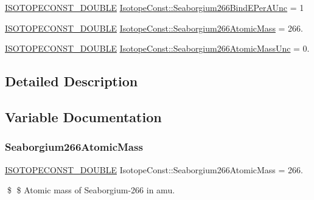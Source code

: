 \begin{DoxyCompactItemize}
\mbox{\hyperlink{group___isotope_const-_macros_ga8f45a7272ce02c0b4c65c44636ed719a}{I\+S\+O\+T\+O\+P\+E\+C\+O\+N\+S\+T\+\_\+\+D\+O\+U\+B\+LE}} \mbox{\hyperlink{group___isotope_const-_seaborgium-_sg266_gafc9faa5a3b4df938ec2469764fbb70aa}{Isotope\+Const\+::\+Seaborgium266\+Bind\+E\+Per\+A\+Unc}} = 1
\item 
\mbox{\hyperlink{group___isotope_const-_macros_ga8f45a7272ce02c0b4c65c44636ed719a}{I\+S\+O\+T\+O\+P\+E\+C\+O\+N\+S\+T\+\_\+\+D\+O\+U\+B\+LE}} \mbox{\hyperlink{group___isotope_const-_seaborgium-_sg266_ga86e309e327c7e48a496f87bc6c057925}{Isotope\+Const\+::\+Seaborgium266\+Atomic\+Mass}} = 266.
\item 
\mbox{\hyperlink{group___isotope_const-_macros_ga8f45a7272ce02c0b4c65c44636ed719a}{I\+S\+O\+T\+O\+P\+E\+C\+O\+N\+S\+T\+\_\+\+D\+O\+U\+B\+LE}} \mbox{\hyperlink{group___isotope_const-_seaborgium-_sg266_ga320bb545b7225c648a7f9b5ecaa9244a}{Isotope\+Const\+::\+Seaborgium266\+Atomic\+Mass\+Unc}} = 0.
\end{DoxyCompactItemize}


\subsection{Detailed Description}


\subsection{Variable Documentation}
\mbox{\label{group___isotope_const-_seaborgium-_sg266_ga86e309e327c7e48a496f87bc6c057925}} 
\subsubsection{\texorpdfstring{Seaborgium266\+Atomic\+Mass}{Seaborgium266AtomicMass}}
{\footnotesize\ttfamily \mbox{\hyperlink{group___isotope_const-_macros_ga8f45a7272ce02c0b4c65c44636ed719a}{I\+S\+O\+T\+O\+P\+E\+C\+O\+N\+S\+T\+\_\+\+D\+O\+U\+B\+LE}} Isotope\+Const\+::\+Seaborgium266\+Atomic\+Mass = 266.}

\$ \$ Atomic mass of Seaborgium-\/266 in amu. \mbox{\label{group___isotope_const-_seaborgium-_sg266_ga320bb545b7225c648a7f9b5ecaa9244a}} 
